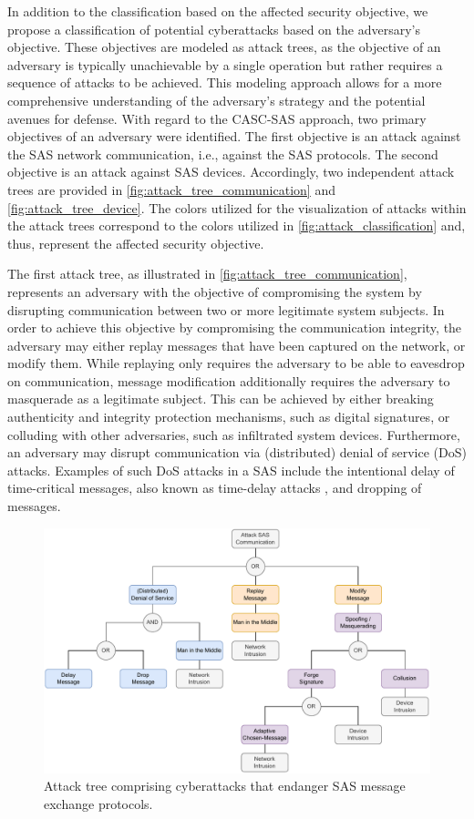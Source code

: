 In addition to the classification based on the affected security objective, we propose a classification of potential cyberattacks based on the adversary's objective.
These objectives are modeled as attack trees, as the objective of an adversary is typically unachievable by a single operation but rather requires a sequence of attacks to be achieved.
This modeling approach allows for a more comprehensive understanding of the adversary's strategy and the potential avenues for defense.
With regard to the CASC-SAS approach, two primary objectives of an adversary were identified.
The first objective is an attack against the SAS network communication, i.e., against the SAS protocols.
The second objective is an attack against SAS devices.
Accordingly, two independent attack trees are provided in \autoref{fig:attack_tree_communication} and \autoref{fig:attack_tree_device}.
The colors utilized for the visualization of attacks within the attack trees correspond to the colors utilized in \autoref{fig:attack_classification} and, thus, represent the affected security objective.

The first attack tree, as illustrated in \autoref{fig:attack_tree_communication}, represents an adversary with the objective of compromising the system by disrupting communication between two or more legitimate system subjects.
In order to achieve this objective by compromising the communication integrity, the adversary may either replay messages that have been captured on the network, or modify them.
While replaying only requires the adversary to be able to eavesdrop on communication, message modification additionally requires the adversary to masquerade as a legitimate subject.
This can be achieved by either breaking authenticity and integrity protection mechanisms, such as digital signatures, or colluding with other adversaries, such as infiltrated system devices.
Furthermore, an adversary may disrupt communication via (distributed) denial of service (DoS) attacks.
Examples of such DoS attacks in a SAS include the intentional delay of time-critical messages, also known as time-delay attacks \cite{Bianchin2018}, and dropping of messages.
\begin{figure}
    \centering
    \includegraphics[width=1.0\linewidth]{figures/attack_tree_communication.drawio.pdf}
    \caption{Attack tree comprising cyberattacks that endanger SAS message exchange protocols.}
    \label{fig:attack_tree_communication}
\end{figure}

